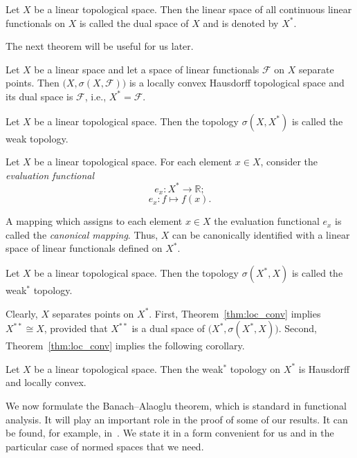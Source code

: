 \documentclass{svproc}
\begin{document}
\begin{definition}
Let $X$ be a linear topological space. Then the linear space of all continuous linear functionals on $X$ is called the dual space of $X$ and is denoted by $X^*$.
\end{definition}

The next theorem will be useful for us later.

\begin{theorem}\label{thm:loc_conv}
Let $X$ be a linear space and let a space of linear functionals $\mathcal{F}$ on $X$ separate points. Then $\bigl(X, \sigma(X, \mathcal{F})\bigr)$ is a locally convex Hausdorff topological space and its dual space is $\mathcal{F}$, i.e., $X^* = \mathcal{F}$.
\end{theorem}

\begin{definition}
Let $X$ be a linear topological space. Then the topology $\sigma(X, X^*)$ is called the weak topology.
\end{definition}

Let $X$ be a linear topological space. For each element $x\in X$, consider the \textit{evaluation functional}
$$e_x\colon X^*\rightarrow \mathbb{R};$$
$$e_x\colon f\mapsto f(x).$$

A mapping which assigns to each element $x\in X$ the evaluation functional $e_x$ is called the \textit{canonical mapping}. Thus, $X$ can be canonically identified with a linear space of linear functionals defined on $X^*$.

\begin{definition}
Let $X$ be a linear topological space. Then the topology $\sigma(X^*, X)$ is called the weak$^*$ topology.
\end{definition}

\begin{remark}\label{rk:reflex}
Clearly, $X$ separates points on $X^*$. First, Theorem~\ref{thm:loc_conv} implies $X^{**}\cong X$, provided that $X^{**}$ is a dual space of $\bigl(X^*, \sigma(X^*, X)\bigr)$. Second, Theorem~\ref{thm:loc_conv} implies the following corollary.
\end{remark}

\begin{corollary}\label{cor:Haus_loc}
Let $X$ be a linear topological space. Then the weak$^*$ topology on $X^*$ is Hausdorff and locally convex.
\end{corollary}

We now formulate the Banach--Alaoglu theorem, which is standard in functional analysis. It will play an important role in the proof of some of our results. It can be found, for example, in~\cite[Theorem~3.15]{Rudin}. We state it in a form convenient for us and in the particular case of normed spaces that we need.
\end{document}
